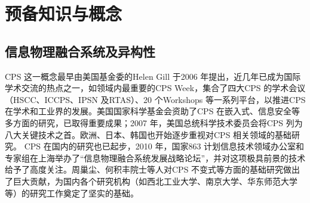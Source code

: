 \chapter{预备知识与概念}
\label{ch2}

\section{信息物理融合系统及异构性}
CPS 这一概念最早由美国基金委的Helen Gill 于2006 年提出，近几年已成为国际学术交流的热点之一，如领域内最重要的CPS Week，集合了四大CPS 的学术会议（HSCC、ICCPS、IPSN 及RTAS）、20 个Workshops 等一系列平台，以推进CPS 在学术和工业界的发展。美国国家科学基金会资助了CPS 在嵌入式、信息安全等多方面的研究，已取得重要成果；2007 年，美国总统科学技术委员会将CPS 列为八大关键技术之首。欧洲、日本、韩国也开始逐步重视对CPS 相关领域的基础研究。
CPS 在国内的研究也已起步，2010 年，国家863 计划信息技术领域办公室和专家组在上海举办了“信息物理融合系统发展战略论坛”，并对这项极具前景的技术给予了高度关注。周巢尘、何积丰院士等人对CPS 不变式等方面的基础研究做出了巨大贡献，为国内各个研究机构（如西北工业大学、南京大学、华东师范大学等）的研究工作奠定了坚实的基础。
